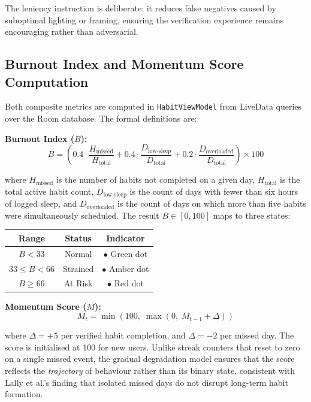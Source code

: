 \documentclass[12pt,a4paper]{article}
\begin{document}
The leniency instruction is deliberate: it reduces false negatives caused by suboptimal
lighting or framing, ensuring the verification experience remains encouraging rather
than adversarial.

\subsection{Burnout Index and Momentum Score Computation}

Both composite metrics are computed in \texttt{HabitViewModel} from LiveData queries
over the Room database. The formal definitions are:

\medskip
\textbf{Burnout Index ($B$):}
\[
B = \left( 0.4 \cdot \frac{H_{\text{missed}}}{H_{\text{total}}} +
           0.4 \cdot \frac{D_{\text{low-sleep}}}{D_{\text{total}}} +
           0.2 \cdot \frac{D_{\text{overloaded}}}{D_{\text{total}}} \right) \times 100
\]

where $H_{\text{missed}}$ is the number of habits not completed on a given day,
$H_{\text{total}}$ is the total active habit count, $D_{\text{low-sleep}}$ is the
count of days with fewer than six hours of logged sleep, and $D_{\text{overloaded}}$
is the count of days on which more than five habits were simultaneously scheduled.
The result $B \in [0, 100]$ maps to three states:

\begin{center}
\begin{tabular}{ccc}
\toprule
\textbf{Range} & \textbf{Status} & \textbf{Indicator} \\
\midrule
$B < 33$  & Normal    & \textcolor{fluxgreen}{$\bullet$} Green dot \\
$33 \le B < 66$ & Strained & \textcolor{fluxamber}{$\bullet$} Amber dot \\
$B \ge 66$ & At Risk  & \textcolor{fluxred}{$\bullet$} Red dot \\
\bottomrule
\end{tabular}
\end{center}

\medskip
\textbf{Momentum Score ($M$):}
\[
M_{t} = \min\!\left(100,\; \max\!\left(0,\; M_{t-1} + \Delta\right)\right)
\]

where $\Delta = +5$ per verified habit completion, and $\Delta = -2$ per missed
day. The score is initialised at 100 for new users. Unlike streak counters that
reset to zero on a single missed event, the gradual degradation model ensures that
the score reflects the \textit{trajectory} of behaviour rather than its binary
state, consistent with Lally et al.'s finding that isolated missed days do not
disrupt long-term habit formation.
\end{document}
